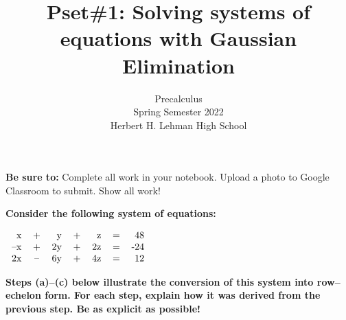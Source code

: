 \documentclass{exam}
\title{Pset\#1: Solving systems of equations with Gaussian Elimination }
\author{Precalculus \\ Spring Semester 2022 \\ Herbert H. Lehman High School}
\begin{document}
\maketitle
\noindent\textbf{Be sure to: } Complete all work in your notebook. Upload a photo to Google Classroom to submit.  Show all work!
\vspace{5mm}





\begin{questions}
\question

\textbf{Consider the following system of equations:}

$
\begin{tabular}{r c r c r c r }
x & + & y & + & z & = & 48 \\

--x & + & 2y & + &2z & = & -24  \\

2x & -- & 6y & + & 4z & = & 12 \\
\end{tabular}
$

\textbf{Steps (a)--(c) below illustrate the conversion of this system into row--echelon form.  For each step, explain how it was derived from the previous step.  Be as explicit as possible!}
\vspace{0.3cm}
\end{questions}
\end{document}
